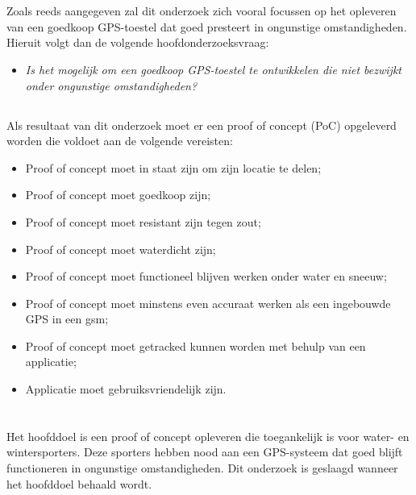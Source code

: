 \section{}
\subsection{}
\label{sec:onderzoeksvraag}

Zoals reeds aangegeven zal dit onderzoek zich vooral focussen op het opleveren van een goedkoop GPS-toestel dat goed presteert in ongunstige omstandigheden. Hieruit volgt dan de volgende hoofdonderzoeksvraag:
\newline
\begin{itemize}
	\item[] \textit{Is het mogelijk om een goedkoop GPS-toestel te ontwikkelen die niet bezwijkt onder ongunstige omstandigheden?}
\end{itemize}

\subsection{}
Als resultaat van dit onderzoek moet er een proof of concept (PoC) opgeleverd worden die voldoet aan de volgende vereisten:
\begin{itemize}
	\item Proof of concept moet in staat zijn om zijn locatie te delen;
	\item Proof of concept moet goedkoop zijn;
	\item Proof of concept moet resistant zijn tegen zout;
	\item Proof of concept moet waterdicht zijn;
    \item Proof of concept moet functioneel blijven werken  onder water en sneeuw;
	\item Proof of concept moet minstens even accuraat werken als een ingebouwde GPS in een gsm;
	\item Proof of concept moet getracked kunnen worden met behulp van een applicatie;
	\item Applicatie moet gebruiksvriendelijk zijn.
\end{itemize}

\section{}
\label{sec:onderzoeksdoelstelling}
Het hoofddoel is een proof of concept opleveren die toegankelijk is voor water- en wintersporters. Deze sporters hebben nood aan een GPS-systeem dat goed blijft functioneren in ongunstige omstandigheden. Dit onderzoek is geslaagd wanneer het hoofddoel behaald wordt.


